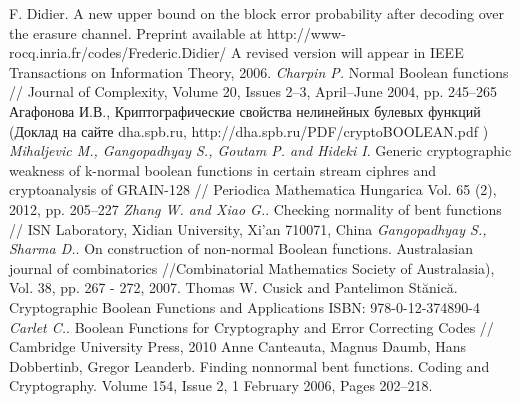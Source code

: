 \begin{thebibliography}{99}
 F. Didier. A new upper bound on the block error probability after decoding over the erasure channel. Preprint available at http://www-rocq.inria.fr/codes/Frederic.Didier/ A revised version will appear in IEEE Transactions on Information Theory, 2006.
 {\it Charpin P.} Normal Boolean functions // Journal of Complexity, Volume 20, Issues 2–3, April–June 2004, pp. 245–265
 Агафонова И.В., Криптографические свойства нелинейных булевых функций (Доклад на сайте dha.spb.ru, http://dha.spb.ru/PDF/cryptoBOOLEAN.pdf )
 {\it Mihaljevic M., Gangopadhyay S., Goutam P. and Hideki I}. Generic cryptographic weakness of k-normal boolean functions in certain stream ciphres and cryptoanalysis of GRAIN-128 // Periodica Mathematica Hungarica Vol. 65 (2), 2012, pp. 205–227
 {\it Zhang W. and Xiao G.}. Checking normality of bent functions // ISN Laboratory, Xidian University, Xi’an 710071, China
 {\it Gangopadhyay S., Sharma D.}. On construction of non-normal Boolean functions. Australasian journal of combinatorics //Combinatorial Mathematics Society of Australasia), Vol. 38, pp. 267 - 272, 2007.
 Thomas W. Cusick and Pantelimon Stănică. Cryptographic Boolean Functions and Applications ISBN: 978-0-12-374890-4
 {\it Carlet C.}. Boolean Functions for Cryptography and Error Correcting Codes // Cambridge University Press, 2010
 Anne Canteauta, Magnus Daumb, Hans Dobbertinb, Gregor Leanderb. Finding nonnormal bent functions. Coding and Cryptography. Volume 154, Issue 2, 1 February 2006, Pages 202–218.







\end{thebibliography}
